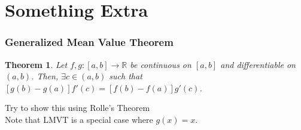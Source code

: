 \documentclass[handout,aspectratio=169]{beamer}
\newtheorem{thm}{Theorem}
\newcommand{\bR}{\mathbb{R}}
\begin{document}
\section{Something Extra}
\begin{frame}
\frametitle{Generalized Mean Value Theorem}
\begin{thm}
Let $f,g : [a,b] \to \bR$ be continuous on $[a,b]$ and differentiable on $(a,b)$. Then, $\exists c\in (a,b)$ such that $[g(b)-g(a)]f'(c) = [f(b)-f(a)]g'(c)$.
\end{thm}
\pause
Try to show this using Rolle's Theorem \\ [1mm]
\pause
Note that LMVT is a special case where $g(x) = x$.
\end{frame}
\end{document}
